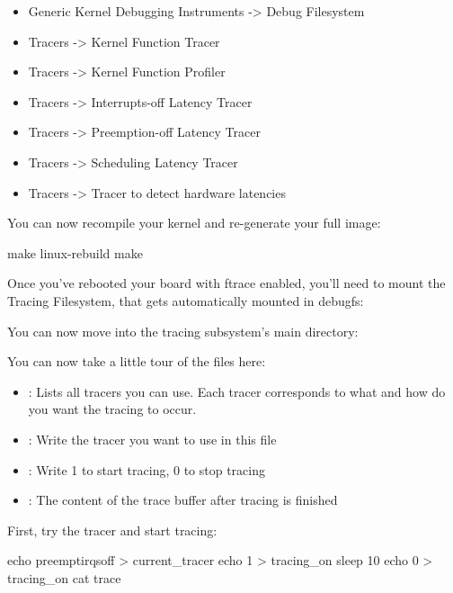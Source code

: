 \begin{itemize}
        \item Generic Kernel Debugging Instruments -> Debug Filesystem
        \item Tracers -> Kernel Function Tracer
        \item Tracers -> Kernel Function Profiler
        \item Tracers -> Interrupts-off Latency Tracer
        \item Tracers -> Preemption-off Latency Tracer
        \item Tracers -> Scheduling Latency Tracer
        \item Tracers -> Tracer to detect hardware latencies
\end{itemize}

You can now recompile your kernel and re-generate your full image:

\begin{bashinput}
make linux-rebuild
make
\end{bashinput}

Once you've rebooted your board with ftrace enabled, you'll need to mount the
Tracing Filesystem, that gets automatically mounted in debugfs:



You can now move into the tracing subsystem's main directory:


You can now take a little tour of the files here:

\begin{itemize}
        \item {}: Lists all tracers you can use. Each tracer
                corresponds to what and how do you want the tracing to occur.
        \item {}: Write the tracer you want to use in this file
        \item {}: Write 1 to start tracing, 0 to stop tracing
        \item {}: The content of the trace buffer after tracing is finished
\end{itemize}

First, try the  tracer and start tracing:

\begin{bashinput}
echo preemptirqsoff > current_tracer
echo 1 > tracing_on
sleep 10
echo 0 > tracing_on
cat trace
\end{bashinput}

